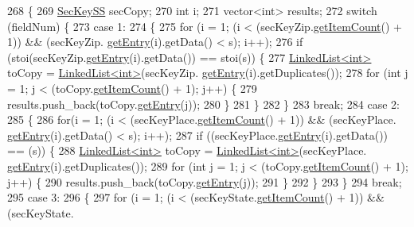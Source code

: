 \begin{DoxyCode}
268                                                        \{
269     \hyperlink{classSecKeySS}{SecKeySS} secCopy;
270     \textcolor{keywordtype}{int} i;
271     vector<int> results;
272     \textcolor{keywordflow}{switch} (fieldNum) \{
273     \textcolor{keywordflow}{case} 1:
274     \{
275         \textcolor{keywordflow}{for} (i = 1; (i < (secKeyZip.\hyperlink{classLinkedList_afc6635f854f48f2f126cf3b60d845220}{getItemCount}() + 1)) && (secKeyZip.
      \hyperlink{classLinkedList_a341bfd7772c9d24d29eb7a7f3936915b}{getEntry}(i).getData() < s); i++);
276         \textcolor{keywordflow}{if} (stoi(secKeyZip.\hyperlink{classLinkedList_a341bfd7772c9d24d29eb7a7f3936915b}{getEntry}(i).getData()) == stoi(s)) \{
277             \hyperlink{classLinkedList}{LinkedList<int>} toCopy = \hyperlink{classLinkedList}{LinkedList<int>}(secKeyZip.
      \hyperlink{classLinkedList_a341bfd7772c9d24d29eb7a7f3936915b}{getEntry}(i).getDuplicates());
278             \textcolor{keywordflow}{for} (\textcolor{keywordtype}{int} j = 1; j < (toCopy.\hyperlink{classLinkedList_afc6635f854f48f2f126cf3b60d845220}{getItemCount}() + 1); j++) \{
279                 results.push\_back(toCopy.\hyperlink{classLinkedList_a341bfd7772c9d24d29eb7a7f3936915b}{getEntry}(j));
280             \}
281         \}
282     \}
283     \textcolor{keywordflow}{break};
284     \textcolor{keywordflow}{case} 2:
285     \{
286         \textcolor{keywordflow}{for}(i = 1; (i < (secKeyPlace.\hyperlink{classLinkedList_afc6635f854f48f2f126cf3b60d845220}{getItemCount}() + 1)) && (secKeyPlace.
      \hyperlink{classLinkedList_a341bfd7772c9d24d29eb7a7f3936915b}{getEntry}(i).getData() < s); i++);
287         \textcolor{keywordflow}{if} ((secKeyPlace.\hyperlink{classLinkedList_a341bfd7772c9d24d29eb7a7f3936915b}{getEntry}(i).getData()) == (s)) \{
288             \hyperlink{classLinkedList}{LinkedList<int>} toCopy = \hyperlink{classLinkedList}{LinkedList<int>}(secKeyPlace.
      \hyperlink{classLinkedList_a341bfd7772c9d24d29eb7a7f3936915b}{getEntry}(i).getDuplicates());
289             \textcolor{keywordflow}{for} (\textcolor{keywordtype}{int} j = 1; j < (toCopy.\hyperlink{classLinkedList_afc6635f854f48f2f126cf3b60d845220}{getItemCount}() + 1); j++) \{
290                 results.push\_back(toCopy.\hyperlink{classLinkedList_a341bfd7772c9d24d29eb7a7f3936915b}{getEntry}(j));
291             \}
292         \}
293     \}
294     \textcolor{keywordflow}{break};
295     \textcolor{keywordflow}{case} 3:
296     \{
297         \textcolor{keywordflow}{for} (i = 1; (i < (secKeyState.\hyperlink{classLinkedList_afc6635f854f48f2f126cf3b60d845220}{getItemCount}() + 1)) && (secKeyState.

\end{DoxyCode}
